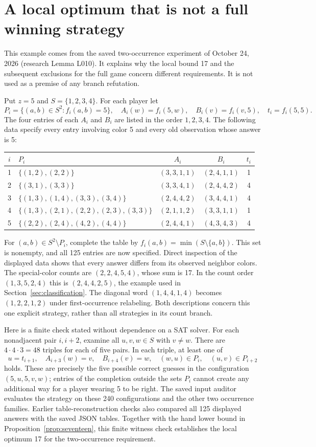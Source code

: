 \section{A local optimum that is not a full winning strategy}\label{app:witness}
This example comes from the saved two-occurrence experiment of
October 24, 2026 (research Lemma L010). It explains why the local bound
17 and the subsequent exclusions for the full game concern different
requirements. It is not used as a premise of any branch refutation.

Put $z=5$ and $S=\{1,2,3,4\}$. For each player let
\[
P_i=\{(a,b)\in S^2:f_i(a,b)=5\},\quad
A_i(w)=f_i(5,w),\quad B_i(v)=f_i(v,5),\quad t_i=f_i(5,5).
\]
The four entries of each $A_i$ and $B_i$ are listed in the order
$1,2,3,4$. The following data specify every entry involving color 5 and
every old observation whose answer is 5:
\begin{center}\small
\begin{tabular}{@{}clccc@{}}
\toprule
$i$&$P_i$&$A_i$&$B_i$&$t_i$\\
\midrule
1&$\{(1,2),(2,2)\}$&$(3,3,1,1)$&$(2,4,1,1)$&1\\
2&$\{(3,1),(3,3)\}$&$(3,3,4,1)$&$(2,4,4,2)$&4\\
3&$\{(1,3),(1,4),(3,3),(3,4)\}$&$(2,4,4,2)$&$(3,4,4,1)$&4\\
4&$\{(1,3),(2,1),(2,2),(2,3),(3,3)\}$&$(2,1,1,2)$&$(3,3,1,1)$&1\\
5&$\{(2,2),(2,4),(4,2),(4,4)\}$&$(2,4,4,1)$&$(4,3,4,3)$&4\\
\bottomrule
\end{tabular}
\end{center}
For $(a,b)\in S^2\setminus P_i$, complete the table by
$f_i(a,b)=\min(S\setminus\{a,b\})$. This set is nonempty, and all
125 entries are now specified. Direct inspection of the displayed data
shows that every answer differs from its observed neighbor colors.
The special-color counts are $(2,2,4,5,4)$, whose sum is 17.
In the count order $(1,3,5,2,4)$ this is $(2,4,4,2,5)$, the example
used in Section~\ref{sec:classification}. The diagonal word
$(1,4,4,1,4)$ becomes $(1,2,2,1,2)$ under first-occurrence relabeling.
Both descriptions concern this one explicit strategy, rather than all
strategies in its count branch.

Here is a finite check stated without dependence on a SAT solver.
For each nonadjacent pair $i,i+2$, examine all
$u,v,w\in S$ with $v\ne w$. There are $4\cdot4\cdot3=48$
triples for each of five pairs. In each triple, at least one of
\[
u=t_{i+1},\quad A_{i+3}(w)=v,\quad B_{i+4}(v)=w,\quad
(w,u)\in P_i,\quad(u,v)\in P_{i+2}
\]
holds. These are precisely the five possible correct guesses in the
configuration $(5,u,5,v,w)$; entries of the completion outside the sets
$P_i$ cannot create any additional way for a player wearing 5 to be right.
The saved input auditor evaluates the strategy on these 240 configurations
and the other two occurrence families. Earlier table-reconstruction
checks also compared all 125 displayed answers with the saved JSON tables.
Together with the hand lower bound in Proposition~\ref{prop:seventeen},
this finite witness check establishes the local optimum 17 for the
two-occurrence requirement.

